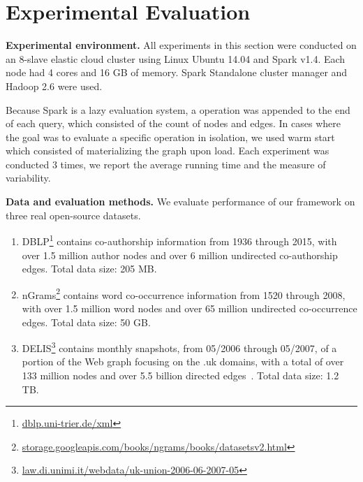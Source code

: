 \section{Experimental Evaluation}
\label{sec:exp}

{\bf Experimental environment.} All experiments in this section were
conducted on an 8-slave elastic cloud cluster using Linux Ubuntu 14.04
and Spark v1.4.  Each node had 4 cores and 16 GB of memory.  Spark
Standalone cluster manager and Hadoop 2.6 were used.

Because Spark is a lazy evaluation system, a 
operation was appended to the end of each query, which consisted of
the count of nodes and edges.  In cases where the goal was to evaluate
a specific operation in isolation, we used warm start which consisted
of materializing the graph upon load.  Each experiment was conducted 3
times, we report the average running time and the measure of
variability.

{\bf Data and evaluation methods.}  We evaluate performance of our
framework on three real open-source datasets.  

\begin{enumerate}

\item DBLP\footnote{\url{dblp.uni-trier.de/xml}} contains
  co-authorship information from 1936 through 2015, with over 1.5
  million author nodes and over 6 million undirected co-authorship
  edges.  Total data size: 205 MB.

\item nGrams\footnote{\url{storage.googleapis.com/books/ngrams/books/datasetsv2.html}}
  contains word co-occurrence information from 1520 through 2008, with
  over 1.5 million word nodes and over 65 million undirected
  co-occurrence edges.  Total data size: 50 GB. 

\item
  DELIS\footnote{\url{law.di.unimi.it/webdata/uk-union-2006-06-2007-05}}
  contains monthly snapshots, from 05/2006 through 05/2007, of a
  portion of the Web graph focusing on the .uk domains, with a total
  of over 133 million nodes and over 5.5 billion directed
  edges~\cite{BSVLTAG}.  Total data size: 1.2 TB. 

\end{enumerate}

